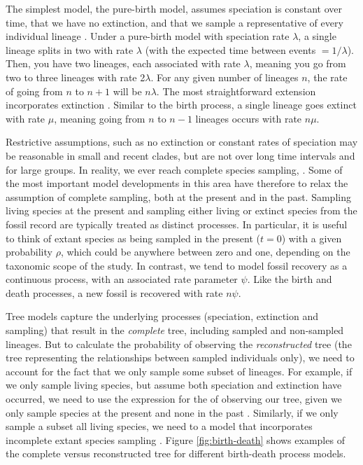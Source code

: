 The simplest model, the pure-birth model, assumes speciation is constant over time, that we have no extinction, and that we sample a representative of every individual lineage \citep{Yule1925}.
Under a pure-birth model with speciation rate $\lambda$, a single lineage splits in two with rate $\lambda$ (with the expected time between events $=1/\lambda$). Then, you have two lineages, each associated with rate $\lambda$, meaning you go from two to three lineages with rate 2$\lambda$. For any given number of lineages $n$, the rate of going from $n$ to $n+1$ will be $n\lambda$.
The most straightforward extension incorporates  extinction \citep{Kendall1948}.
Similar to the birth process, a single lineage goes extinct with rate $\mu$, meaning going from $n$ to $n-1$ lineages occurs with rate $n\mu$.

Restrictive assumptions, such as no extinction or constant rates of speciation may be reasonable in small and recent clades, but are not  over long time intervals and for large groups.
In reality, we  ever reach complete species sampling, .
Some of the most important model developments in this area have therefore  to relax the assumption of complete sampling, both at the present and in the past.
Sampling living species at the present and sampling either living or extinct species from the fossil record are typically treated as distinct processes.
In particular, it is useful to think of extant species as being sampled in the present ($t=0$) with a given probability $\rho$, which could be anywhere between zero and one, depending on the taxonomic scope of the study.
In contrast, we tend to model fossil recovery as a continuous process, with an associated rate parameter $\psi$. Like the birth and death processes, a new fossil is recovered with rate $n\psi$.

Tree models capture the underlying processes (speciation, extinction and sampling) that result in the \textit{complete} tree, including sampled and non-sampled lineages. But to calculate the probability of observing the  \textit{reconstructed} tree (the tree representing the relationships between sampled individuals only), we need to account for the fact that we only sample some subset of lineages.
For example, if we only sample living species, but assume both speciation and extinction have occurred, we need to use the expression for the  of observing our tree, given we only sample species at the present and none in the past \citep{Thompson1975,Gernhard2008, Stadler2009}.  Similarly, if we only sample a subset  all living species, we need to  a model that incorporates incomplete extant species sampling \citep{Yang1997,Stadler2009}.
Figure \ref{fig:birth-death} shows examples of the complete versus  reconstructed tree for different birth-death process models.

